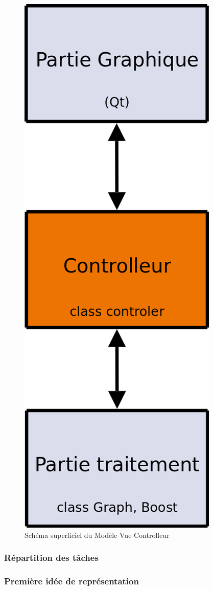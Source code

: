 \begin{figure}[!ht]
\begin{center}
        \includegraphics[height=0.3\textheight]{./schema/mvcScheme.png}
\caption{Schéma superficiel du Modèle Vue Controlleur}
\label{mvc}
\end{center}
\end{figure}
\subsubsection{Répartition des tâches}




\subsubsection{Première idée de représentation}


